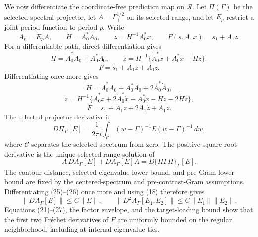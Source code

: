 We now differentiate the coordinate-free prediction map on \(\mathcal R\).
Let \(\Pi(\Gamma)\) be the selected spectral projector, let
\(A=\Gamma_+^{1/2}\) on its selected range, and let \(E_p\) restrict a
joint-period function to period \(p\).  Write
\[
 A_p=E_pA,\qquad H=A_0^*A_0,\qquad
 z=H^{-1}A_0^*x,\qquad F(s,A,x)=s_1+A_1z.                \tag{20}
\]
For a differentiable path, direct differentiation gives
\[
 \dot H=\dot A_0^*A_0+A_0^*\dot A_0,
 \qquad
 \dot z=H^{-1}\{\dot A_0^*x+A_0^*\dot x-\dot Hz\},     \tag{21}
\]
\[
 \dot F=\dot s_1+\dot A_1z+A_1\dot z.                  \tag{22}
\]
Differentiating once more gives
\[
 \ddot H=\ddot A_0^*A_0+A_0^*\ddot A_0
          +2\dot A_0^*\dot A_0,
\]
\[
 \ddot z=H^{-1}\{\ddot A_0^*x+2\dot A_0^*\dot x
 +A_0^*\ddot x-\ddot Hz-2\dot H\dot z\},               \tag{23}
\]
\[
 \ddot F=\ddot s_1+\ddot A_1z+2\dot A_1\dot z+A_1\ddot z. \tag{24}
\]
The selected-projector derivative is
\[
 D\Pi_\Gamma[E]
 =\frac{1}{2\pi i}\int_{\mathscr C}
 (w-\Gamma)^{-1}E(w-\Gamma)^{-1}\,dw,                  \tag{25}
\]
where \(\mathscr C\) separates the selected spectrum from zero.  The
positive-square-root derivative is the unique selected-range solution of
\[
 A\,DA_\Gamma[E]+DA_\Gamma[E]A
 =D\{\Pi\Gamma\Pi\}_\Gamma[E].                          \tag{26}
\]
The contour distance, selected eigenvalue lower bound, and pre-Gram lower bound
are fixed by the centered-spectrum and pre-contrast-Gram assumptions.
Differentiating (25)--(26) once more and using (18) therefore gives
\[
 \|DA_\Gamma[E]\|\leq C\|E\|,
 \qquad
 \|D^2A_\Gamma[E_1,E_2]\|
 \leq C\|E_1\|\|E_2\|.                                 \tag{27}
\]
Equations (21)--(27), the factor envelope, and the target-loading bound show
that the first two Fr\'echet derivatives of \(F\) are uniformly bounded on the
regular neighborhood, including at internal eigenvalue ties.

